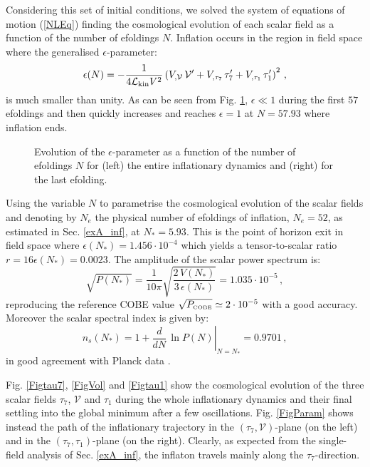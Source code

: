 \documentclass[11pt,a4paper]{article}
\newcommand{\be}{\begin{equation}}
\newcommand{\ee}{\end{equation}}
\newcommand\vo{{\mathcal{V}}}
\newcommand{\mc}{\mathcal}
\begin{document}
Considering this set of initial conditions, we solved the system of equations of motion (\ref{NLEq}) finding the cosmological evolution of each scalar field as a function of the number of efoldings $N$. Inflation occurs in the region in field space where the generalised $\epsilon$-parameter:
\be
\epsilon (N) =-\frac{1}{4\mc{L}_{\rm kin} V^2}\left(V_{,\vo}\,\vo^\prime+V_{,\tau_7}\,\tau_7^\prime+V_{,\tau_1}\,\tau_1^\prime\right)^2\,,
\label{GenEps}
\ee
is much smaller than unity. As can be seen from Fig. \ref{FigEps}, $\epsilon\ll 1$ during the first $57$ efoldings and then quickly increases and reaches $\epsilon = 1$ at $N=57.93$ where inflation ends. 

\begin{figure}[ht]
\begin{center}
\caption{Evolution of the $\epsilon$-parameter as a function of the number of efoldings $N$ for (left) the entire inflationary dynamics and (right) for the last efolding.}
\label{FigEps}
\end{center}
\end{figure}

Using the variable $N$ to parametrise the cosmological evolution of the scalar fields and denoting by $N_e$ the physical number of efoldings of inflation, $N_e = 52$, as estimated in Sec. \ref{exA_inf}, at $N_* = 5.93$. This is the point of horizon exit in field space where $\epsilon (N_*) = 1.456\cdot 10^{-4}$ which yields a tensor-to-scalar ratio $r = 16 \epsilon(N_*) = 0.0023$. The amplitude of the scalar power spectrum is:
\be
\sqrt{P(N_*)} = \frac{1}{10\pi}\sqrt{\frac{2\,V(N_*)}{3\,\epsilon(N_*)}} = 1.035 \cdot 10^{-5}\,,
\ee
reproducing the reference COBE value $\sqrt{P_{\scriptscriptstyle{\rm COBE}}}\simeq 2\cdot 10^{-5}$ with a good accuracy. Moreover the scalar spectral index is given by:
\be
n_s (N_*) = 1 + \left.\frac{d}{dN}\,\ln P(N)\right|_{N=N_*} = 0.9701\,,
\ee
in good agreement with Planck data \cite{Ade:2015lrj, Ade:2015xua}. 

Fig. \ref{Figtau7}, \ref{FigVol} and \ref{Figtau1} show the cosmological evolution of the three scalar fields $\tau_7$, $\vo$ and $\tau_1$ during the whole inflationary dynamics and their final settling into the global minimum after a few oscillations. Fig. \ref{FigParam} shows instead the path of the inflationary trajectory in the $(\tau_7, \vo)$-plane (on the left) and in the $(\tau_7, \tau_1)$-plane (on the right). Clearly, as expected from the single-field analysis of Sec. \ref{exA_inf}, the inflaton travels mainly along the $\tau_7$-direction. 
\end{document}
